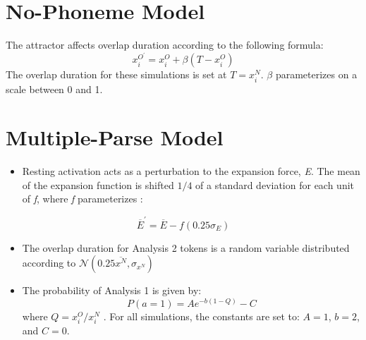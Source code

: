 \section{No-Phoneme Model}
The  attractor affects overlap duration according to the following
formula:
\begin{equation}
x_{i}^{O^{\prime}}=x_{i}^{O}+\beta(T-x_{i}^{O})\label{eq:Frequency attractor-1}
\end{equation}
The  overlap duration for these simulations is set at $T=x_{i}^{N}$.
$\beta$ parameterizes  on a scale between 0 and 1. 

\section{Multiple-Parse Model}
\begin{itemize}
\item Resting activation acts as a perturbation to the expansion force,
\emph{E}. The mean of the expansion function is shifted ${1}/{4}$
of a standard deviation for each unit of \emph{f}, where \emph{f} parameterizes
:
\end{itemize}
\[
\overline{E}^{\prime}=\overline{E}-f(0.25\sigma_{E})
\]

\begin{itemize}
\item The overlap duration for Analysis 2 tokens is a random variable distributed
according to $\mathcal{\mathscr{N}}\left(0.25\overline{x^{N}},\sigma_{x^{N}}\right)$
\item The probability of Analysis 1 is given by:
\begin{equation}
P(a=1)=Ae^{-b(1-Q)}-C\label{eq:segmentation-1-1}
\end{equation}
where $Q={x_{i}^{O}}/{x_{i}^{N}}$\emph{ }. For all simulations,
the constants are set to: $A=1$, $b=2$, and $C=0$.
\end{itemize}
